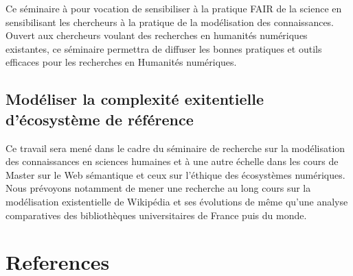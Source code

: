 \documentclass[
  letterpaper,
  DIV=11,
  numbers=noendperiod]{scrreprt}
\begin{document}
Ce séminaire à pour vocation de sensibiliser à la pratique FAIR de la
science en sensibilisant les chercheurs à la pratique de la modélisation
des connaissances. Ouvert aux chercheurs voulant des recherches en
humanités numériques existantes, ce séminaire permettra de diffuser les
bonnes pratiques et outils efficaces pour les recherches en Humanités
numériques.

\hypertarget{sec-modeliserEcosystemeReference}{%
\section{Modéliser la complexité exitentielle d'écosystème de
référence}\label{sec-modeliserEcosystemeReference}}

Ce travail sera mené dans le cadre du séminaire de recherche sur la
modélisation des connaissances en sciences humaines et à une autre
échelle dans les cours de Master sur le Web sémantique et ceux sur
l'éthique des écosystèmes numériques. Nous prévoyons notamment de mener
une recherche au long cours sur la modélisation existentielle de
Wikipédia et ses évolutions de même qu'une analyse comparatives des
bibliothèques universitaires de France puis du monde.


\hypertarget{references}{%
\chapter*{References}\label{references}}

\end{document}
